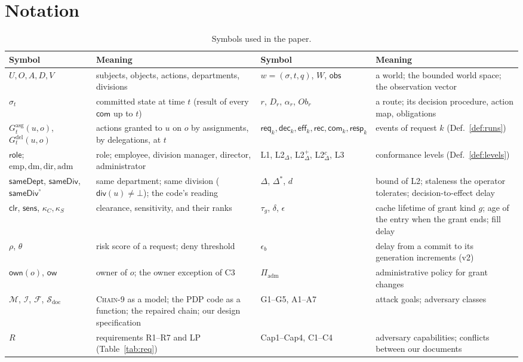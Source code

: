 \documentclass[sigconf,review,anonymous]{acmart}
\newcommand{\chain}{\textsc{Chain-9}\xspace}
\newcommand{\ow}{\mathsf{ow}}
\newcommand{\Gasg}{G^{\mathrm{asg}}}
\newcommand{\Gdel}{G^{\mathrm{del}}}
\newcommand{\sameDept}{\mathsf{sameDept}}
\newcommand{\sameDiv}{\mathsf{sameDiv}}
\newcommand{\role}{\mathsf{role}}
\newcommand{\obs}{\mathsf{obs}}
\newcommand{\emp}{\mathrm{emp}}
\newcommand{\ev}[1]{\mathsf{#1}}
\begin{document}
\section{Notation}
\label{app:notation}
\begin{table}[t]
\caption{Symbols used in the paper.}
\label{tab:notation}
\footnotesize
\begin{tabularx}{\textwidth}{@{}l@{\;\;}>{\raggedright\arraybackslash}X@{\quad}l@{\;\;}>{\raggedright\arraybackslash}X@{}}
\toprule
Symbol & Meaning & Symbol & Meaning \\
\midrule
$U,O,A,D,V$ & subjects, objects, actions, departments, divisions & $w=(\sigma,t,q)$, $W$, $\obs$ & a world; the bounded world space; the observation vector \\
$\sigma_t$ & committed state at time $t$ (result of every $\ev{com}$ up to $t$) & $r$, $D_r$, $\alpha_r$, $\mathit{Ob}_r$ & a route; its decision procedure, action map, obligations \\
$\Gasg_t(u,o)$, $\Gdel_t(u,o)$ & actions granted to $u$ on $o$ by assignments, by delegations, at $t$ & $\ev{req}_k,\ev{dec}_k,\ev{eff}_k,\ev{rec},\ev{com}_k,\ev{resp}_k$ & events of request $k$ (Def.~\ref{def:runs}) \\
$\role$; $\emp,\mathrm{dm},\mathrm{dir},\mathrm{adm}$ & role; employee, division manager, director, administrator & L1, L2$_\Delta$, L2$^+_\Delta$, L2$^c_\Delta$, L3 & conformance levels (Def.~\ref{def:levels}) \\
$\sameDept$, $\sameDiv$, $\sameDiv^\circ$ & same department; same division ($\mathsf{div}(u)\neq\bot$); the code's reading & $\Delta$, $\Delta^\ast$, $d$ & bound of L2; staleness the operator tolerates; decision-to-effect delay \\
$\mathsf{clr}$, $\mathsf{sens}$, $\kappa_C,\kappa_S$ & clearance, sensitivity, and their ranks & $\tau_g$, $\delta$, $\epsilon$ & cache lifetime of grant kind $g$; age of the entry when the grant ends; fill delay \\
$\rho$, $\theta$ & risk score of a request; deny threshold & $\epsilon_b$ & delay from a commit to its generation increments (v2) \\
$\mathsf{own}(o)$, $\ow$ & owner of $o$; the owner exception of C3 & $\Pi_{\mathrm{adm}}$ & administrative policy for grant changes \\
$\mathcal{M}$, $\mathcal{I}$, $\mathcal{F}$, $\mathcal{S}_{\mathrm{doc}}$ & \chain as a model; the PDP code as a function; the repaired chain; our design specification & G1--G5, A1--A7 & attack goals; adversary classes \\
$R$ & requirements R1--R7 and LP (Table~\ref{tab:req}) & Cap1--Cap4, C1--C4 & adversary capabilities; conflicts between our documents \\
\bottomrule
\end{tabularx}
\end{table}
\end{document}
